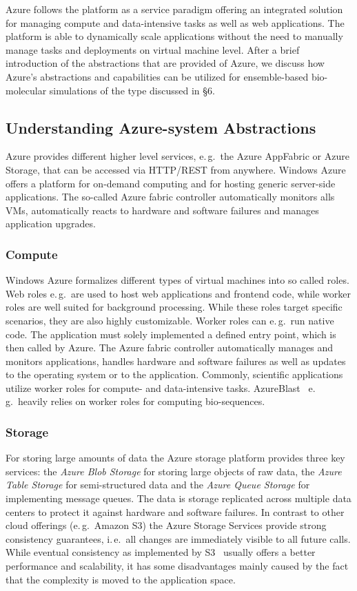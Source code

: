 \documentclass[graybox]{svmult}
\begin{document}
Azure follows the platform as a service paradigm offering an
integrated solution for managing compute and data-intensive tasks as
well as web applications. The platform is able to dynamically scale
applications without the need to manually manage tasks and deployments
on virtual machine level. After a brief introduction of the
abstractions that are provided of Azure, we discuss how Azure's
abstractions and capabilities can be utilized for ensemble-based
bio-molecular simulations of the type discussed in \S6.

\subsection{Understanding Azure-system Abstractions}

Azure provides different higher level services, e.\,g.\ the Azure
AppFabric or Azure Storage, that can be accessed via HTTP/REST from
anywhere. Windows Azure offers a platform for on-demand computing and
for hosting generic server-side applications. The so-called Azure
fabric controller automatically monitors alls VMs, automatically
reacts to hardware and software failures and manages application
upgrades.

\subsubsection{Compute}
Windows Azure formalizes different types of virtual machines into
so called roles. Web roles e.\,g.\ are used to host web applications
and frontend code, while worker roles are well suited for background
processing. While these roles target specific scenarios, they are also
highly customizable. Worker roles can e.\,g.\ run native code. The
application must solely implemented a defined entry point, which is
then called by Azure. The Azure fabric controller automatically
manages and monitors applications, handles hardware and software
failures as well as updates to the operating system or to the
application.  Commonly, scientific applications utilize worker roles
for compute- and data-intensive tasks. AzureBlast~\cite{azure_blast}
e.\,g.\ heavily relies on worker roles for computing bio-sequences.

\subsubsection{Storage}
For storing large amounts of data the Azure storage platform
provides three key services: the \emph{Azure Blob Storage} for storing
large objects of raw data, the \emph{Azure Table Storage} for
semi-structured data and the \emph{Azure Queue Storage} for
implementing message queues.  The data is storage replicated across
multiple data centers to protect it against hardware and software
failures. In contrast to other cloud offerings (e.\,g.\ Amazon S3) the
Azure Storage Services provide strong consistency guarantees, i.\,e.\
all changes are immediately visible to all future calls. While
eventual consistency as implemented by S3~\cite{1294281} usually
offers a better performance and scalability, it has some disadvantages
mainly caused by the fact that the complexity is moved to the
application space.
\end{document}
